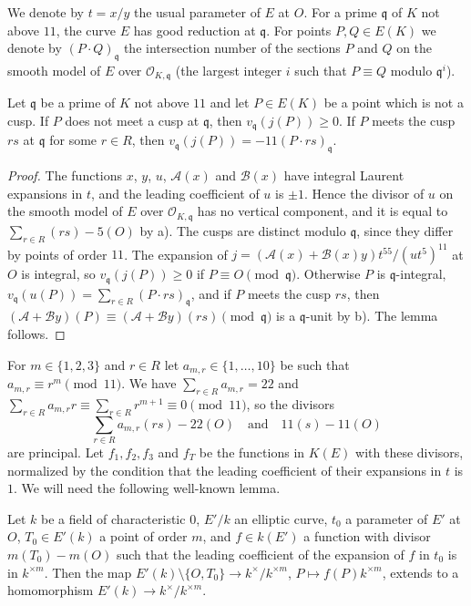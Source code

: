 \documentclass[11pt,reqno]{amsart}
\newcommand{\OO}{\mathcal{O}}
\newcommand{\fq}{\mathfrak{q}}
\theoremstyle{definition}
\numberwithin{equation}{section}
\begin{document}
We denote by $t=x/y$ the usual parameter of $E$ at $O$. For a prime $\fq$ of $K$ not above $11$, the curve $E$ has good reduction at $\fq$. For points $P,Q\in E(K)$ we denote by $(P\cdot Q)_\fq$ the intersection number of the sections $P$ and $Q$ on the smooth model of $E$ over $\OO_{K,\fq}$ (the largest integer $i$ such that $P\equiv Q$ modulo $\fq^i$).

\begin{lemma}\label{lem:cusp_valuations}
Let $\fq$ be a prime of $K$ not above $11$ and let $P\in E(K)$ be a point which is not a cusp. If $P$ does not meet a cusp at $\fq$, then $v_\fq(j(P))\geq 0$. If $P$ meets the cusp $rs$ at $\fq$ for some $r\in R$, then $v_\fq(j(P))=-11(P\cdot rs)_\fq$.
\end{lemma}

\begin{proof}
The functions $x$, $y$, $u$, $\mathcal A(x)$ and $\mathcal B(x)$ have integral Laurent expansions in $t$, and the leading coefficient of $u$ is $\pm 1$. Hence the divisor of $u$ on the smooth model of $E$ over $\OO_{K,\fq}$ has no vertical component, and it is equal to $\sum_{r\in R}(rs)-5(O)$ by  a). The cusps are distinct modulo $\fq$, since they differ by points of order $11$. The expansion of $j=(\mathcal A(x)+\mathcal B(x)y)t^{55}/(ut^5)^{11}$ at $O$ is integral, so $v_\fq(j(P))\geq 0$ if $P\equiv O \pmod \fq$. Otherwise $P$ is $\fq$-integral, $v_\fq(u(P))=\sum_{r\in R} (P\cdot rs)_\fq$, and if $P$ meets the cusp $rs$, then $(\mathcal A+\mathcal By)(P)\equiv (\mathcal A+\mathcal By)(rs)\pmod \fq$ is a $\fq$-unit by  b). The lemma follows.
\end{proof}

For $m\in\{1,2,3\}$ and $r\in R$ let $a_{m,r}\in\{1,\ldots,10\}$ be such that $a_{m,r}\equiv r^m\pmod{11}$. We have $\sum_{r\in R}a_{m,r}=22$ and $\sum_{r\in R}a_{m,r}r\equiv \sum_{r\in R}r^{m+1}\equiv 0\pmod{11}$, so the divisors
$$\sum_{r\in R}a_{m,r}(rs)-22(O) \quad\text{and}\quad 11(s)-11(O)$$
are principal. Let $f_1,f_2,f_3$ and $f_T$ be the functions in $K(E)$ with these divisors, normalized by the condition that the leading coefficient of their expansions in $t$ is $1$. We will need the following well-known lemma.

\begin{lemma}\label{lem:hom}
Let $k$ be a field of characteristic $0$, $E'/k$ an elliptic curve, $t_0$ a parameter of $E'$ at $O$, $T_0\in E'(k)$ a point of order $m$, and $f\in k(E')$ a function with divisor $m(T_0)-m(O)$ such that the leading coefficient of the expansion of $f$ in $t_0$ is in $k^{\times m}$. Then the map $E'(k)\setminus\{O,T_0\}\rightarrow k^\times/k^{\times m}$, $P\mapsto f(P)k^{\times m}$, extends to a homomorphism $E'(k)\rightarrow k^\times/k^{\times m}$.
\end{lemma}
\end{document}
